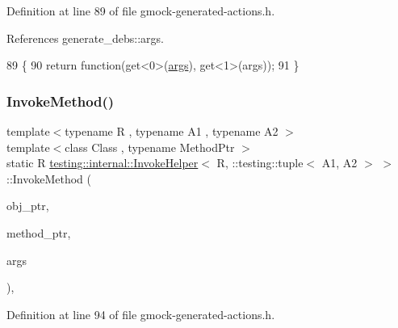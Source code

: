 Definition at line 89 of file gmock-\/generated-\/actions.\+h.



References generate\+\_\+debs\+::args.


\begin{DoxyCode}
89                                                                        \{
90            \textcolor{keywordflow}{return} \textcolor{keyword}{function}(get<0>(\hyperlink{namespacegenerate__debs_a75f9143e38df82d83b2e8a6f99cae02c}{args}), get<1>(args));
91   \}
\end{DoxyCode}
\mbox{\label{classtesting_1_1internal_1_1InvokeHelper_3_01R_00_01_1_1testing_1_1tuple_3_01A1_00_01A2_01_4_01_4_a227b8f07bfda13f6cb390655fc84f1ee}} 
\subsubsection{\texorpdfstring{Invoke\+Method()}{InvokeMethod()}}
{\footnotesize\ttfamily template$<$typename R , typename A1 , typename A2 $>$ \\
template$<$class Class , typename Method\+Ptr $>$ \\
static R \hyperlink{classtesting_1_1internal_1_1InvokeHelper}{testing\+::internal\+::\+Invoke\+Helper}$<$ R, \+::testing\+::tuple$<$ A1, A2 $>$ $>$\+::Invoke\+Method (\begin{DoxyParamCaption}\item[{Class $\ast$}]{obj\+\_\+ptr,  }\item[{Method\+Ptr}]{method\+\_\+ptr,  }\item[{const \+::testing\+::tuple$<$ A1, A2 $>$ \&}]{args }\end{DoxyParamCaption})\hspace{0.3cm}{\ttfamily [inline]}, {\ttfamily [static]}}



Definition at line 94 of file gmock-\/generated-\/actions.\+h.



